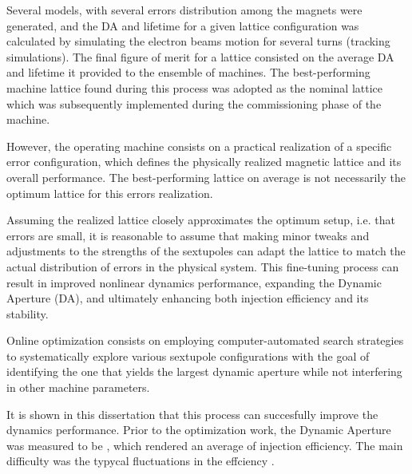 Several models, with several errors distribution among the magnets were generated, and the DA and lifetime for a given lattice configuration was calculated by simulating the electron beams motion for several turns (tracking simulations). The final figure of merit for a lattice consisted on the average DA and lifetime it provided to the ensemble of machines. The best-performing machine lattice found during this process was adopted as the nominal lattice which was subsequently implemented during the commissioning phase of the machine.

However, the operating machine consists on a practical realization of a specific error configuration, which defines the physically realized magnetic lattice and its overall performance. The best-performing lattice on average is not necessarily the optimum lattice for this errors realization.

Assuming the realized lattice closely approximates the optimum setup, i.e. that errors are small, it is reasonable to assume that making minor tweaks and adjustments to the strengths of the sextupoles can adapt the lattice to match the actual distribution of errors in the physical system. This fine-tuning process can result in improved nonlinear dynamics performance, expanding the Dynamic Aperture (DA), and ultimately enhancing both injection efficiency and its stability.

Online optimization consists on employing computer-automated search strategies to systematically explore various sextupole configurations with the goal of identifying the one that yields the largest dynamic aperture while not interfering in other machine parameters.

It is shown in this dissertation that this process can succesfully improve the dynamics performance. Prior to the optimization work, the Dynamic Aperture was measured to be , which rendered an average of  injection efficiency. The main difficulty was the typycal fluctuations in the effciency .
